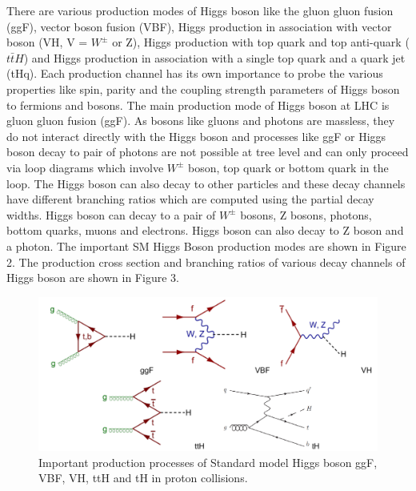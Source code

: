 \documentclass[final,3p]{CSP}
\begin{document}

There are various production modes of Higgs boson like the gluon gluon fusion (ggF), vector boson fusion (VBF), Higgs 
production in association with vector boson (VH, V = $W^{\pm}$ or Z), Higgs production with top quark and top anti-quark ($t\bar{t}H$) and Higgs 
production in association with a single top quark and a quark jet (tHq). Each production channel has its own importance to probe the 
various properties like spin, parity and the coupling strength parameters of Higgs boson to fermions and bosons. The main production mode of Higgs boson at LHC is 
gluon gluon fusion (ggF). As bosons like gluons and photons are massless, they do not interact directly with the Higgs boson 
and processes like ggF or Higgs boson decay to pair of photons are not possible at tree level and can only proceed via loop 
diagrams which involve $W^{\pm}$ boson, top quark or bottom quark in the loop. The Higgs boson can also decay to other particles and these decay 
channels have different branching ratios which are computed using the partial decay widths. Higgs boson can decay to a pair of $W^{\pm}$ bosons, Z bosons, photons, bottom quarks, 
muons and electrons. Higgs boson can also decay to Z boson and a photon. The important SM Higgs Boson production modes are shown in Figure 2. The production cross section and branching ratios of various decay channels of Higgs boson are shown in Figure 3.

\begin{figure}[H]
	\centering
	\includegraphics[width=\columnwidth]{./pg.png}
	\caption{Important production processes of Standard model Higgs boson ggF, VBF, VH, ttH and tH in proton collisions.}
	\label{figure 2}
\end{figure}
\end{document}
